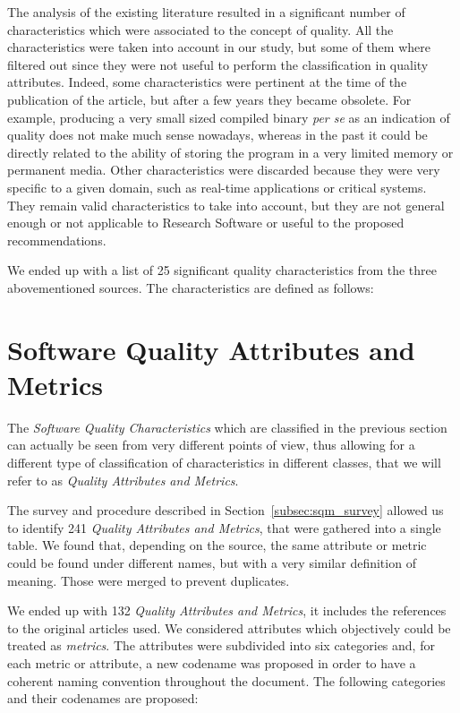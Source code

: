 \documentclass[a4paper]{article}
\begin{document}
The analysis of the existing literature resulted in a significant number of characteristics which were associated to the concept of quality. All the characteristics were taken into account in our study, but some of them where filtered out since they were not useful to perform the classification in quality attributes. Indeed, some characteristics were pertinent at the time of the publication of the article, but after a few years they became obsolete. For example, producing a very small sized compiled binary \textit{per se} as an indication of quality does not make much sense nowadays, whereas in the past it could be directly related to the ability of storing the program in a very limited memory or permanent media. Other characteristics were discarded because they were very specific to a given domain, such as real-time applications or critical systems. They remain valid characteristics to take into account, but they are not general enough or not applicable to Research Software or useful to the proposed recommendations.

We ended up with a list of 25 significant quality characteristics from the three abovementioned sources. The characteristics are defined as follows:



\newpage
\section{Software Quality Attributes and Metrics}
\label{subsec:SW_quality_attributes}

The \textit{Software Quality Characteristics} which are classified in the previous section can actually be seen from very different points of view, thus allowing for a different type of classification of characteristics in different classes, that we will refer to as \textit{Quality Attributes and Metrics}.

The survey and procedure described in Section~\ref{subsec:sqm_survey} allowed us to identify 241 \textit{Quality Attributes and Metrics}, that were gathered into a single table. We found that, depending on the source, the same attribute or metric could be found under different names, but with a very similar definition of meaning. Those were merged to prevent duplicates.

We ended up with 132 \textit{Quality Attributes and Metrics}, it includes the references to the original articles used. We considered attributes which objectively could be treated as \textit{metrics}. The attributes were subdivided into six categories and, for each metric or attribute, a new codename was proposed in order to have a coherent naming convention throughout the document. The following categories and their codenames are proposed:
\end{document}
